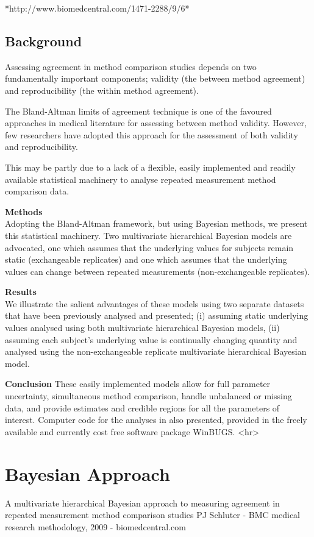 \documentclass[12pt, a4paper]{report}
\theoremstyle{plain}
\theoremstyle{definition}
\theoremstyle{remark}
\begin{document}
*http://www.biomedcentral.com/1471-2288/9/6*



\subsection*{Background}
Assessing agreement in method comparison studies depends on two fundamentally important components; validity (the between method agreement) and reproducibility (the within method agreement). 

The Bland-Altman limits of agreement technique is one of the favoured approaches in medical literature for assessing between method validity. However, few researchers have adopted this approach for the assessment of both validity and reproducibility. 

This may be partly due to a lack of a flexible, easily implemented and readily available statistical machinery to analyse repeated measurement method comparison data.

\textbf{Methods}\\
Adopting the Bland-Altman framework, but using Bayesian methods, we present this statistical machinery. Two multivariate hierarchical Bayesian models are advocated, one which assumes that the underlying values for subjects remain static (exchangeable replicates) and one which assumes that the underlying values can change between repeated measurements (non-exchangeable replicates).

\textbf{Results}\\
We illustrate the salient advantages of these models using two separate datasets that have been previously analysed and presented; 
(i) assuming static underlying values analysed using both multivariate hierarchical Bayesian models,  
(ii) assuming each subject's underlying value is continually changing quantity and analysed using the non-exchangeable replicate multivariate hierarchical Bayesian model.  

\textbf{Conclusion}
These easily implemented models allow for full parameter uncertainty, simultaneous method comparison, handle unbalanced or missing data, and provide estimates and credible regions for all the parameters of interest. Computer code for the analyses in also presented, provided in the freely available and currently cost free software package WinBUGS.
<hr>

\section*{Bayesian Approach}
A multivariate hierarchical Bayesian approach to measuring agreement in repeated measurement method comparison studies
PJ Schluter - BMC medical research methodology, 2009 - biomedcentral.com
\end{document}
